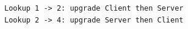 \begin{lstlisting}[language={},basicstyle=\ttfamily\scriptsize,breaklines=true]
Lookup 1 -> 2: upgrade Client then Server
Lookup 2 -> 4: upgrade Server then Client
\end{lstlisting}
